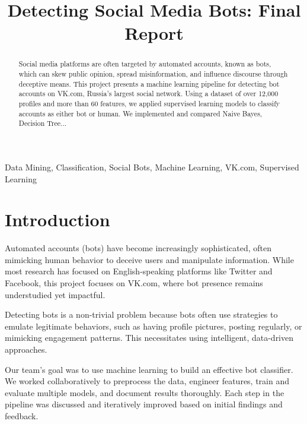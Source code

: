 \documentclass[conference]{IEEEtran}
\begin{document}
\title{Detecting Social Media Bots: Final Report}

\author{
}

\maketitle

\begin{abstract}
Social media platforms are often targeted by automated accounts, known as bots, which can skew public opinion, spread misinformation, and influence discourse through deceptive means. This project presents a machine learning pipeline for detecting bot accounts on VK.com, Russia's largest social network. Using a dataset of over 12,000 profiles and more than 60 features, we applied supervised learning models to classify accounts as either bot or human. We implemented and compared Naive Bayes, Decision Tree...
\end{abstract}

\begin{IEEEkeywords}
Data Mining, Classification, Social Bots, Machine Learning, VK.com, Supervised Learning
\end{IEEEkeywords}

\section{Introduction}
Automated accounts (bots) have become increasingly sophisticated, often mimicking human behavior to deceive users and manipulate information. While most research has focused on English-speaking platforms like Twitter and Facebook, this project focuses on VK.com, where bot presence remains understudied yet impactful.

Detecting bots is a non-trivial problem because bots often use strategies to emulate legitimate behaviors, such as having profile pictures, posting regularly, or mimicking engagement patterns. This necessitates using intelligent, data-driven approaches.

Our team’s goal was to use machine learning to build an effective bot classifier. We worked collaboratively to preprocess the data, engineer features, train and evaluate multiple models, and document results thoroughly. Each step in the pipeline was discussed and iteratively improved based on initial findings and feedback.
\end{document}
